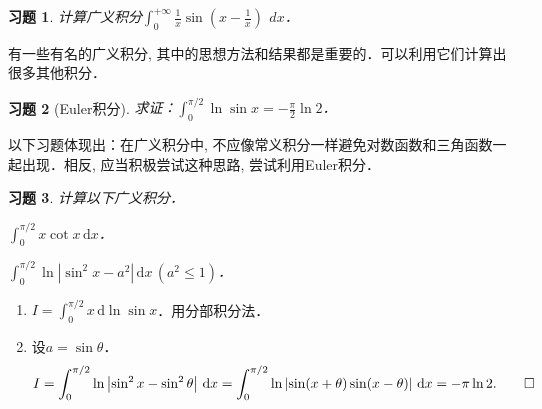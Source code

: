 \documentclass[11pt,a4paper]{ctexart}
\makeatletter
\theoremstyle{thmseries} %
\theoremstyle{exerseries}
\newtheorem{exer}{习题}[section]
\renewenvironment{proof}[1][\proofname]{\par
  \pushQED{\qed}%
  \normalfont \topsep6\p@\@plus6\p@\relax
  \trivlist
  \item[\hskip\labelsep
        \itshape
    #1\@addpunct{}]\ignorespaces
}{%
  \popQED\endtrivlist\@endpefalse
}
\newenvironment{sol}{\begin{proof}[\bfseries\upshape 解\quad]}{\end{proof}}
\newcommand{\bra}[1]{\mathopen{}\left(#1\right)}
\renewcommand{\d}{\mathrm{d}}
\makeatother
\begin{document}
\begin{exer}
	计算广义积分$\int_{0}^{+\infty}\frac{1}{x}\sin\bra{x-\frac{1}{x}}\,\ dx$．
\end{exer}

有一些有名的广义积分, 其中的思想方法和结果都是重要的．可以利用它们计算出很多其他积分．
\begin{exer}[Euler积分]
	求证：$\int_{0}^{\pi/2}\ln\sin x=-\frac{\pi}{2}\ln 2$．
\end{exer}

以下习题体现出：在广义积分中, 不应像常义积分一样避免对数函数和三角函数一起出现．相反, 应当积极尝试这种思路, 尝试利用Euler积分．
\begin{exer}
	计算以下广义积分．
	\begin{enumerate}
	\end{enumerate}
\end{exer}
\begin{sol}
	\begin{enumerate}
		\item $I=\int_{0}^{\pi/2}x\,\d\ln\sin x$．用分部积分法．
		\item 设$a=\sin\theta$．
		\[I=\int_{0}^{\pi/2}\ln\left|\sin^2x-\sin^2\theta\right|\,\d x=\int_{0}^{\pi/2}\ln\left|\sin(x+\theta)\sin(x-\theta)\right|\,\d x=-\pi\ln 2.\qedhere\]
	\end{enumerate}
\end{sol}
\end{document}
